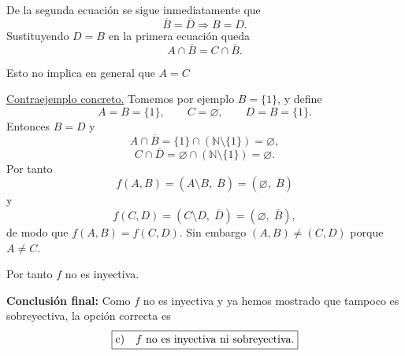 \documentclass[a4paper,12pt]{article}
\begin{document}
\begin{ejercicioExamen}[title=Ejercicio 1]

De la segunda ecuación se sigue inmediatamente que
\[
\overline{B} = \overline{D} \Longrightarrow B = D.
\]
Sustituyendo \(D=B\) en la primera ecuación queda
\[
A \cap \overline{B} = C \cap \overline{B}.
\]

Esto no implica en general que \(A = C\)

\medskip
\underline{Contraejemplo concreto.} Tomemos por ejemplo \(B=\{1\}\), y define
\[
A = B = \{1\},\qquad C = \varnothing,\qquad D = B = \{1\}.
\]
Entonces \(B=D\) y
\[
A \cap \overline{B} = \{1\} \cap (\mathbb{N}\setminus\{1\}) = \varnothing,
\]
\[
C \cap \overline{D} = \varnothing \cap (\mathbb{N}\setminus\{1\}) = \varnothing.
\]
Por tanto
\[
f(A,B) = (A \setminus B,\; \overline{B}) = (\varnothing,\; \overline{B})
\]
y
\[
f(C,D) = (C \setminus D,\; \overline{D}) = (\varnothing,\; \overline{B}),
\]
de modo que \(f(A,B)=f(C,D)\). Sin embargo \((A,B) \neq (C,D)\) porque \(A \neq C\).  

\medskip
Por tanto \(f\) no es inyectiva.

\medskip
\textbf{Conclusión final:} Como \(f\) no es inyectiva y ya hemos mostrado que tampoco es sobreyectiva, la opción correcta es
\[
\boxed{$c)$\quad f \text{ no es inyectiva ni sobreyectiva.}}
\]


\end{ejercicioExamen}
\end{document}
